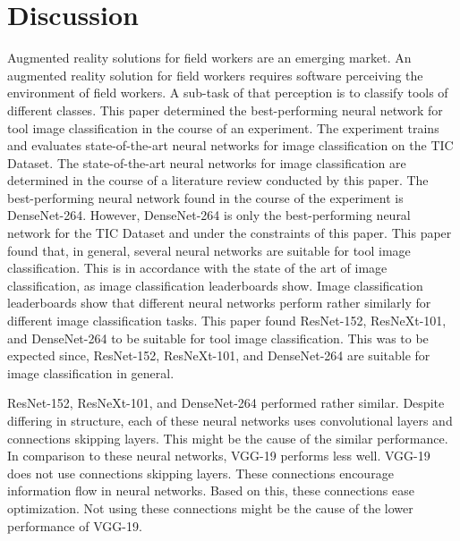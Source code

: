 \chapter{Discussion}
\label{chp:discussion}%
Augmented reality solutions for field workers are an emerging market. \autocites{EY.2019a}{EY.2019b}{Detzel.2018}{Shook.2019}{Guy.2019} An augmented reality solution for field workers requires software perceiving the environment of field workers. A sub-task of that perception is to classify tools of different classes. This paper determined the best-performing neural network for tool image classification in the course of an experiment. The experiment trains and evaluates state-of-the-art neural networks for image classification on the \ac{TIC Dataset}. The state-of-the-art neural networks for image classification are determined in the course of a literature review conducted by this paper. The best-performing neural network found in the course of the experiment is DenseNet-264. However, DenseNet-264 is only the best-performing neural network for the \ac{TIC Dataset} and under the constraints of this paper. This paper found that, in general, several neural networks are suitable for tool image classification. This is in accordance with the state of the art of image classification, as image classification leaderboards show. Image classification leaderboards show that different neural networks perform rather similarly for different image classification tasks. \autocites{imagenet.2019}{cifar.2012}{mnist.2010}{svhn.2011}{stl.2011}{clothing.2016}{fashionMNIST.2017}{Darlow.2018}{flowers.2008}{food.2014}{vanHorn.2018}{stanfordcars.2013}{emnistletters.2017}{kuzushijiMNIST.2018}{cub.2011}{Sabour.2017}{isic1.2019}{isic2.2018}{isic3.2018} 
This paper found ResNet-152, ResNeXt-101, and DenseNet-264 to be suitable for tool image classification. This was to be expected since, ResNet-152, ResNeXt-101, and DenseNet-264 are suitable for image classification in general. \autocites{Xie.2017}{He.2016}{Huang.2017}
\par
ResNet-152, ResNeXt-101, and DenseNet-264 performed rather similar. Despite differing in structure, each of these neural networks uses convolutional layers and connections skipping layers. \autocites{Xie.2017}{He.2016}{Huang.2017} This might be the cause of the similar performance.
In comparison to these neural networks, VGG-19 performs less well. VGG-19 does not use connections skipping layers. \autocite{Simonyan.2014} These connections encourage information flow in neural networks. Based on this, these connections ease optimization. \autocites{He.2016}{Huang.2017} Not using these connections might be the cause of the lower performance of VGG-19.
